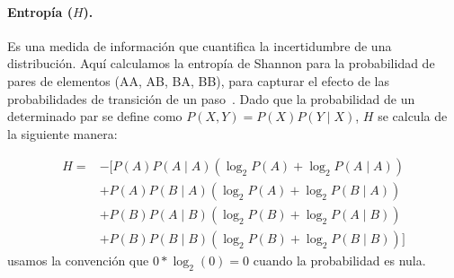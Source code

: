 

\paragraph{Entropía ($H$).} Es una medida de información que cuantifica la incertidumbre de una distribución. Aquí calculamos la entropía de Shannon para la probabilidad de pares de elementos (AA, AB, BA, BB), para capturar el efecto de las probabilidades de transición de un paso~\cite{f85}. Dado que la probabilidad de un determinado par se define como $P(X,Y) = P(X) P(Y \mid X)$, $H$ se calcula de la siguiente manera:

\begin{align*}
H =& - [ 
     P(A) P(A \mid A) (\log_2 P(A) + \log_2 P(A\mid A)) \\
   & +P(A) P(B \mid A) (\log_2 P(A) + \log_2 P(B\mid A)) \\
   & +P(B) P(A \mid B) (\log_2 P(B) + \log_2 P(A\mid B)) \\
   & +P(B) P(B \mid B) (\log_2 P(B) + \log_2 P(B\mid B)) 
     ] 
\end{align*}
usamos la convención que $0 * \log_2(0) = 0$ cuando la probabilidad es nula.


